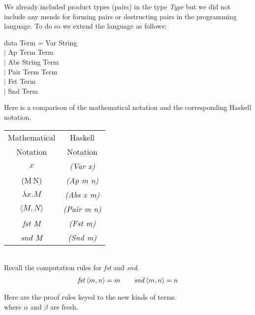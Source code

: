 \documentclass[11pt]{article}
\begin{document}
We already included product types (pairs) in the type {\it{Type}} but we did
not include any mends for forming pairs or destructing pairs in the programming
language.  To do so we extend the language as follows:

\begin{program**}
\>  data Term = Var String  \\
\>            $\mid$ Ap Term Term \\
\>            $\mid$ Abs String Term \\
\>            $\mid$ Pair Term Term\\
\>            $\mid$ Fst Term \\
\>            $\mid$ Snd Term\\
\end{program**}

Here is a comparison of the mathematical notation and the corresponding Haskell notation.
\ \\
\begin{center}
\begin{tabular}{|c|c|}
\hline
Mathematical & Haskell \\
Notation & Notation \\ \hline
$x$  & {\it{(Var x)}}\\
(M\,N) & {\it{(Ap m n)}}\\
$\lambda{}x.M$ & {\it{(Abs x m)}}\\
$\langle{}M,N\rangle$  & {\it{(Pair m n)}}\\
{\it{fst M}} & {\it{(Fst m)}}\\
{\it{snd M}} & {\it{(Snd m)}}\\
\hline
\end{tabular}
\end{center}

\ \\
Recall the computation rules for {\it{fst}} and {\it{snd}}.
\[\begin{array}{ccc} {\mathit{fst}} \,{\langle{m,n}\rangle} = m  && {\mathit{snd}} \,{\langle{m,n}\rangle} = n \end{array}\]

Here are the proof rules keyed to the new kinds of terms.\ \\

{\hspace{.25in}} where $\alpha$ and $\beta$ are fresh.
\ \vspace{.125in}\\
\end{document}
